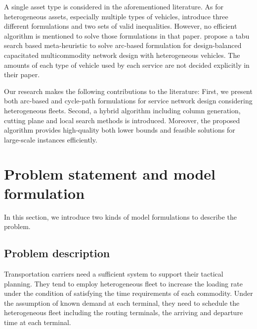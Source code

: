 \documentclass[11pt,nonblindrev,fleqn]{article}
\begin{document}
A single asset type is considered in the aforementioned literature. As for heterogeneous assets, especially multiple types of vehicles, \cite{Kim1999Multimodal} introduce three different formulations and two sets of valid inequalities. However, no efficient algorithm is mentioned to solve those formulations in that paper. \cite{Li2016Design} propose a tabu search based meta-heuristic to solve arc-based formulation for design-balanced capacitated multicommodity network design with heterogeneous vehicles. The amounts of each type of vehicle used by each service are not decided explicitly in their paper.

Our research makes the following contributions to the literature: First, we present both arc-based and cycle-path formulations for service network design considering heterogeneous fleets. Second, a hybrid algorithm including column generation, cutting plane and local search methods is introduced. Moreover, the proposed algorithm provides high-quality both lower bounds and feasible solutions for large-scale instances efficiently.

\section{Problem statement and model formulation}
In this section, we introduce two kinds of model formulations to describe the problem.

\subsection{Problem description}
Transportation carriers need a sufficient system to support their tactical planning. They tend to employ heterogeneous fleet to increase the loading rate under the condition of satisfying the time requirements of each commodity. Under the assumption of known demand at each terminal, they need to schedule the heterogeneous fleet including the routing terminals, the arriving and departure time at each terminal.
\end{document}
